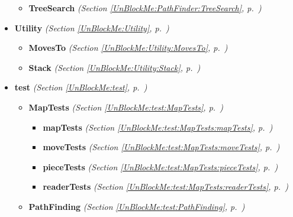 \begin{itemize}
\begin{itemize}
    \item \textbf{TreeSearch}
  \textit{(Section \ref{UnBlockMe:PathFinder:TreeSearch}, p.~\pageref{UnBlockMe:PathFinder:TreeSearch})}

  \end{itemize}
\item \textbf{Utility}
  \textit{(Section \ref{UnBlockMe:Utility}, p.~\pageref{UnBlockMe:Utility})}

  \begin{itemize}
\setlength{\parskip}{0ex}
    \item \textbf{MovesTo}
  \textit{(Section \ref{UnBlockMe:Utility:MovesTo}, p.~\pageref{UnBlockMe:Utility:MovesTo})}

    \item \textbf{Stack}
  \textit{(Section \ref{UnBlockMe:Utility:Stack}, p.~\pageref{UnBlockMe:Utility:Stack})}

  \end{itemize}
\item \textbf{test}
  \textit{(Section \ref{UnBlockMe:test}, p.~\pageref{UnBlockMe:test})}

  \begin{itemize}
\setlength{\parskip}{0ex}
    \item \textbf{MapTests}
  \textit{(Section \ref{UnBlockMe:test:MapTests}, p.~\pageref{UnBlockMe:test:MapTests})}

      \begin{itemize}
    \setlength{\parskip}{0ex}
        \item \textbf{mapTests}
  \textit{(Section \ref{UnBlockMe:test:MapTests:mapTests}, p.~\pageref{UnBlockMe:test:MapTests:mapTests})}

        \item \textbf{moveTests}
  \textit{(Section \ref{UnBlockMe:test:MapTests:moveTests}, p.~\pageref{UnBlockMe:test:MapTests:moveTests})}

        \item \textbf{pieceTests}
  \textit{(Section \ref{UnBlockMe:test:MapTests:pieceTests}, p.~\pageref{UnBlockMe:test:MapTests:pieceTests})}

        \item \textbf{readerTests}
  \textit{(Section \ref{UnBlockMe:test:MapTests:readerTests}, p.~\pageref{UnBlockMe:test:MapTests:readerTests})}

      \end{itemize}
    \item \textbf{PathFinding}
  \textit{(Section \ref{UnBlockMe:test:PathFinding}, p.~\pageref{UnBlockMe:test:PathFinding})}


\end{itemize}
\end{itemize}

